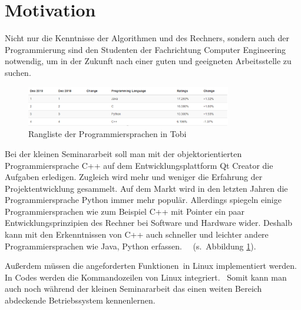 \section{Motivation}
Nicht nur die Kenntnisse der Algorithmen und des Rechners, sondern auch der Programmierung sind den Studenten der Fachrichtung Computer Engineering notwendig, um in der Zukunft nach einer guten und geeigneten Arbeitsstelle zu suchen. 
\begin{figure}[h!]
	\centering
	\includegraphics[width=0.8\textwidth]{bilder/rangliste.png}
	\caption{Rangliste der Programmiersprachen in Tobi}
	\label{Abbildung_1}
\end{figure}
\par Bei der kleinen Seminararbeit soll man mit der objektorientierten Programmiersprache C++ auf dem Entwicklungsplattform Qt Creator die Aufgaben erledigen. Zugleich wird mehr und weniger die Erfahrung der Projektentwicklung gesammelt. Auf dem Markt wird in den letzten Jahren die Programmiersprache Python immer mehr populär. Allerdings spiegeln einige Programmiersprachen wie zum Beispiel C++ mit Pointer ein paar Entwicklungsprinzipien des Rechner bei Software und Hardware wider. Deshalb kann mit den Erkenntnissen von C++ auch schneller und leichter andere Programmiersprachen wie Java, Python erfassen.   (s. Abbildung \ref{Abbildung_1}).
\par Außerdem müssen die angeforderten Funktionen in Linux implementiert werden. In Codes werden die Kommandozeilen von Linux integriert.  Somit kann man auch noch während der kleinen Seminararbeit das einen weiten Bereich abdeckende Betriebssystem kennenlernen.


